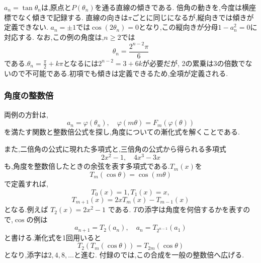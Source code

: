$a_n=\tan\theta_n$は,原点と$P(\theta_n)$を通る直線の傾きである.
倍角の動きを,今度は横座標でなく傾きで記録する.
直線の向きは$\pi$ごとに同じになるが,縦向きでは傾きが定義できない.
$a_n=\pm1$では$\cos(2\theta_n)=0$となり,この縦向きが分母$1-a_n^2=0$に対応する.
なお,この例の角度は,$n\geq2$では
\[
  \theta_n=\frac{2^{n-2}\pi}{6}
\]
である.$\theta_n=\frac{\pi}{2}+k\pi$となるには$2^{n-2}=3+6k$が必要だが,
2の累乗は3の倍数でないので不可能である.初項でも傾きは定義できるため,全項が定義される.

\subsubsection{角度の整数倍}\label{節：角度の整数倍}
両例の方針は,
\[
  a_n=\varphi(\theta_n),
  \quad
  \varphi(m\theta)=F_m(\varphi(\theta))
\]
を満たす関数と整数倍公式を探し,角度についての漸化式を解くことである.

また,二倍角の公式に現れた多項式と,三倍角の公式から得られる多項式
\[
  2x^2-1,
  \quad
  4x^3-3x
\]
も,角度を整数倍したときの余弦を表す多項式である.$T_m(x)$を
\[
  T_m(\cos\theta)=\cos(m\theta)
\]
で定義すれば,
\[
  T_0(x)=1,  T_1(x)=x,
\]
\[
  T_{m+1}(x)=2xT_m(x)-T_{m-1}(x)
\]
となる.例えば $T_2(x)=2x^2-1$ である.
$T$の添字は角度を何倍するかを表すので,$\cos$の例は
\[
  a_{n+1}=T_2(a_n),
  \quad
  a_n=T_{2^{n-1}}(a_1)
\]
と書ける.漸化式を1回用いると
\[
  T_2(T_m(\cos\theta))=T_{2m}(\cos\theta)
\]
となり,添字は$2,4,8,\ldots$と進む.
付録のでは,この合成を一般の整数倍へ広げる.

